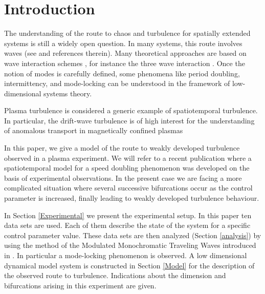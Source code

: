 \section{Introduction}\label{Introduction}

The understanding of the route to chaos and turbulence
for spatially extended systems is still a widely open question.
In many  systems, this route involves waves
(see \cite{Craick} and references therein).
Many theoretical approaches are based on wave interaction schemes
\cite{Craick}, for instance
the three wave interaction \cite{kaup79,chow95,Hasegawa77}.
Once the notion of modes is carefully defined, some phenomena
like period doubling, intermittency, and mode-locking
\cite{Jensen83a,Bishop86a,Stavans85}
can be understood in the framework of low-dimensional systems
theory. 


Plasma turbulence  \cite{tsytovich} is considered  a
generic example of  spatiotemporal turbulence.
In particular, the drift-wave turbulence
\cite{horton84,horton90} is of high interest
for the understanding of anomalous transport in magnetically
confined plasmas \cite{hendel68,horton84,wagner93}

In this paper, we give a model of the route to 
weakly developed turbulence
observed in a plasma experiment.
We will refer to a recent publication
\cite{Madon96}
where a spatiotemporal model for a speed doubling
phenomenon was developed on the basis of experimental observations.
In the present case we are facing
a more complicated situation where several successive bifurcations occur
as the control parameter is increased,  finally leading to weakly 
developed turbulence behaviour.


In Section \ref{Experimental}  we present the experimental setup.
In this paper ten data sets are used.
Each of them describe the state of the system for a specific
control parameter value.
These data sets are then analyzed (Section \ref{analysis}) by using
the method of the Modulated 
Monochromatic Traveling Waves introduced in \cite{Madon96}. In
particular a mode-locking \cite{Arnold89} phenomenon is observed.
A low dimensional dynamical model system 
is constructed in Section \ref{Model} for the description
of the observed route to
turbulence. Indications about the dimension 
and bifurcations arising
in this experiment are given.



